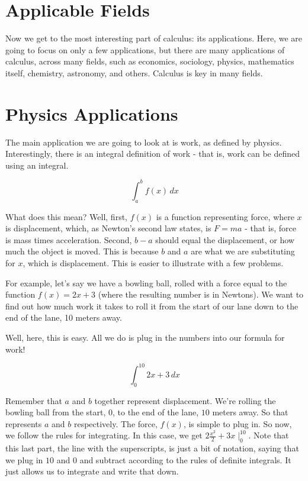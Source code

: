 \chapter{Applicable Fields}
Now we get to the most interesting part of calculus: its applications. 
Here, we are going to focus on only a few applications, but there are many applications of calculus, across many fields, such as economics, sociology, physics, mathematics itself, chemistry, astronomy, and others. 
Calculus is key in many fields.
\chapter{Physics Applications}
The main application we are going to look at is work, as defined by physics. 
Interestingly, there is an integral definition of work - that is, work can be defined using an integral.

\begin{equation*}
    \int^b_a f(x) \, dx
\end{equation*}

What does this mean? 
Well, first, $f(x)$ is a function representing force, where $x$ is displacement, which, as Newton's second law states, is $F = ma$ - that is, force is mass times acceleration. 
Second, $b - a$ should equal the displacement, or how much the object is moved. This is because $b$ and $a$ are what we are substituting for $x$, which is displacement.
This is easier to illustrate with a few problems.

For example, let's say we have a bowling ball, rolled with a force equal to the function $f(x) = 2x+3$ (where the resulting number is in Newtons). 
We want to find out how much work it takes to roll it from the start of our lane down to the end of the lane, 10 meters away.

Well, here, this is easy. All we do is plug in the numbers into our formula for work! 

\begin{equation*}
    \int^{10}_0 2x+3 \, dx
\end{equation*}

Remember that $a$ and $b$ together represent displacement. 
We're rolling the bowling ball from the start, $0$, to the end of the lane, $10$ meters away. 
So that represents $a$ and $b$ respectively. 
The force, $f(x)$, is simple to plug in. 
So now, we follow the rules for integrating. 
In this case, we get $2\frac{x^2}{2}+3x\mid^{10}_0$. 
Note that this last part, the line with the superscripts, is just a bit of notation, saying that we plug in $10$ and $0$ and subtract according to the rules of definite integrals. 
It just allows us to integrate and write that down. 


